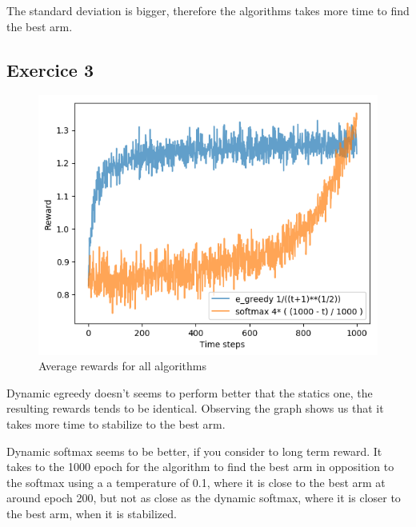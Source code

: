 \documentclass[letterpaper]{article}
\begin{document}
The standard deviation is bigger, therefore the algorithms takes more time
to find the best arm.

\subsection{Exercice 3}

\begin{figure}[H]
    \centering
    \includegraphics[width=.7\linewidth]{images/assign3/ex3/rewards}
    \caption{Average rewards for all algorithms}
    \label{fig:rewards_ex3}
\end{figure}

Dynamic egreedy doesn't seems to perform better that the statics one,
the resulting rewards tends to be identical. Observing the graph shows
us that it takes more time to stabilize to the best arm.

Dynamic softmax seems to be better, if you consider to long term reward.
It takes to the 1000 epoch for the algorithm to find the best arm in
opposition to the softmax using a a temperature of 0.1, where it
is close to the best arm at around epoch 200, but not as close as
the dynamic softmax, where it is closer to the best arm, when it
is stabilized.
\end{document}
